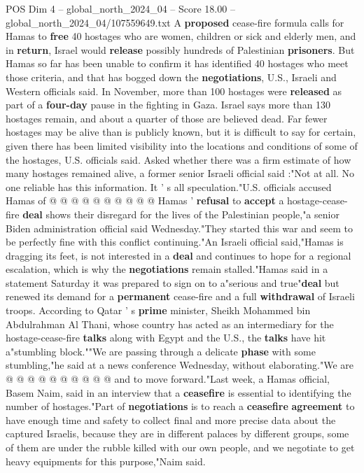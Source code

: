 \begin{textsample}{POS Dim 4 – global\_north\_2024\_04 – Score 18.00 – global\_north\_2024\_04/107559649.txt}  \label{ex:f4_pos_367}
A \textbf{proposed} cease-fire formula calls for Hamas to \textbf{free} 40 hostages who are women, children or sick and elderly men, and in \textbf{return}, Israel would \textbf{release} possibly hundreds of Palestinian \textbf{prisoners}.
But Hamas so far has been unable to confirm it has identified 40 hostages who meet those criteria, and that has bogged down the \textbf{negotiations}, U.S., Israeli and Western officials said.
In November, more than 100 hostages were \textbf{released} as part of a \textbf{four-day} pause in the fighting in Gaza.
Israel says more than 130 hostages remain, and about a quarter of those are believed dead.
Far fewer hostages may be alive than is publicly known, but it is difficult to say for certain, given there has been limited visibility into the locations and conditions of some of the hostages, U.S. officials said.
Asked whether there was a firm estimate of how many hostages remained alive, a former senior Israeli official said :"Not at all.
No one reliable has this information.
It ' s all speculation."U.S. officials accused Hamas of @ @ @ @ @ @ @ @ @ @ Hamas ' \textbf{refusal} to \textbf{accept} a hostage-cease-fire \textbf{deal} shows their disregard for the lives of the Palestinian people,"a senior Biden administration official said Wednesday."They started this war and seem to be perfectly fine with this conflict continuing."An Israeli official said,"Hamas is dragging its feet, is not interested in a \textbf{deal} and continues to hope for a regional escalation, which is why the \textbf{negotiations} remain stalled."Hamas said in a statement Saturday it was prepared to sign on to a"serious and true"\textbf{deal} but renewed its demand for a \textbf{permanent} cease-fire and a full \textbf{withdrawal} of Israeli troops.
According to Qatar ' s \textbf{prime} minister, Sheikh Mohammed bin Abdulrahman Al Thani, whose country has acted as an intermediary for the hostage-cease-fire \textbf{talks} along with Egypt and the U.S., the \textbf{talks} have hit a"stumbling block.""We are passing through a delicate \textbf{phase} with some stumbling,"he said at a news conference Wednesday, without elaborating."We are @ @ @ @ @ @ @ @ @ @ and to move forward."Last week, a Hamas official, Basem Naim, said in an interview that a \textbf{ceasefire} is essential to identifying the number of hostages."Part of \textbf{negotiations} is to reach a \textbf{ceasefire} \textbf{agreement} to have enough time and safety to collect final and more precise data about the captured Israelis, because they are in different palaces by different groups, some of them are under the rubble killed with our own people, and we negotiate to get heavy equipments for this purpose,"Naim said.

\end{textsample}
